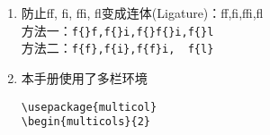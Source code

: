\documentclass{article}
\begin{document}
\begin{multicols}{2}
\begin{enumerate}
\item 防止f{}f, f{}i, f{}f{}i, f{}l变成连体(Ligature)：ff,fi,ffi,fl\\
方法一：\verb|f{}f,f{}i,f{}f{}i,f{}l| \\
方法二：\verb|f{f},f{i},f{f}i,  f{l}| \\


\item 本手册使用了多栏环境
\begin{lstlisting}  
\usepackage{multicol}      
\begin{multicols}{2} 


\end{lstlisting}
\end{enumerate}
\end{multicols}
\end{document}
